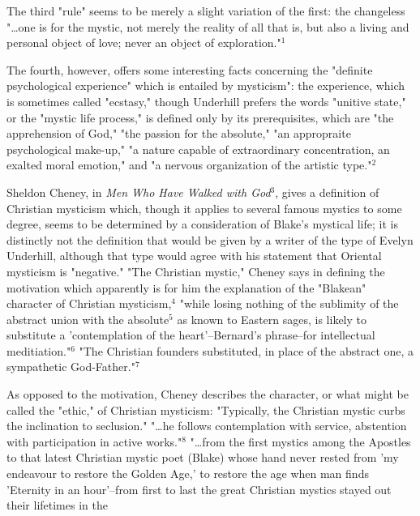The third "rule" seems to be merely a slight variation
of the first: the changeless "\dots one is for the mystic, not
merely the reality of all that is, but also a living and
personal object of love; never an object of exploration."$^{1}$\par
\vspace*{0.5\baselineskip}
The fourth, however, offers some interesting facts concerning
the "definite psychological experience" which is entailed
by mysticism": the experience, which is sometimes called
"ecstasy," though Underhill prefers the words "unitive state,"
or the "mystic life process," is defined only by its prerequisites,
which are "the apprehension of God," "the passion
for the absolute," "an appropraite psychological make-up,"
"a nature capable of extraordinary concentration, an exalted
moral emotion," and "a nervous organization of the artistic type."$^{2}$\par
\vspace*{0.5\baselineskip}
Sheldon Cheney, in \textit{Men Who Have Walked with God}$^{3}$,
gives a definition of Christian mysticism which, though it
applies to several famous mystics to some degree, seems to
be determined by a consideration of Blake's mystical life;
it is distinctly not the definition that would be given by
a writer of the type of Evelyn Underhill, although that
type would agree with his statement that Oriental mysticism
is "negative." "The Christian mystic," Cheney says in defining
the motivation which apparently is for him the explanation
of the "Blakean" character of Christian mysticism,$^{4}$
"while losing nothing of the sublimity of the abstract union
with the absolute$^{5}$ as known to Eastern sages, is likely to
substitute a 'contemplation of the heart'--Bernard's phrase--for
intellectual meditiation."$^{6}$ "The Christian founders substituted,
in place of the abstract one, a sympathetic God-Father."$^{7}$\par
\vspace*{0.5\baselineskip}
As opposed to the motivation, Cheney describes the
character, or what might be called the "ethic," of Christian
mysticism: "Typically, the Christian mystic curbs the inclination
to seclusion." "\dots he follows contemplation with
service, abstention with participation in active works."$^{8}$
"\dots from the first mystics among the Apostles to that latest
Christian mystic poet (Blake) whose hand never rested from
'my endeavour to restore the Golden Age,' to restore the age
when man finds 'Eternity in an hour'--from first to last the
great Christian mystics stayed out their lifetimes in the
